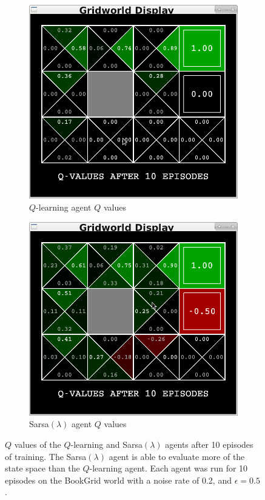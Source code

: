 \documentclass[10pt,conference]{IEEEtran}
\begin{document}
	\begin{figure}[h]
		\centering
		\begin{subfigure}[b]{0.25\textwidth}
			\includegraphics[width=\textwidth]{./images/qlearning_gridworld_10}
			\caption{\(Q\)-learning agent \(Q\) values}
		\end{subfigure}%
		\begin{subfigure}[b]{0.25\textwidth}
			\includegraphics[width=\textwidth]{./images/sarsa_gridworld_10}
			\caption{Sarsa\((\lambda)\) agent \(Q\) values}
		\end{subfigure}
		\caption{\(Q\) values of the \(Q\)-learning and Sarsa\((\lambda)\) agents 
		after 10 episodes of training.  The Sarsa\((\lambda)\) agent is able
		to evaluate more of the state space than the \(Q\)-learning agent.
		Each agent was run for 10 episodes on the BookGrid world with a noise
		rate of 0.2, and \(\epsilon = 0.5\).}
		\label{qvalues}
	\end{figure}
\end{document}
